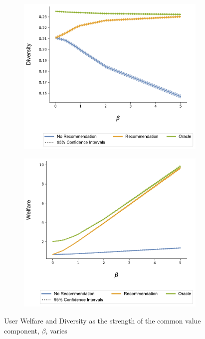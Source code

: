 \documentclass[format=acmsmall, review=false]{acmart}
\begin{document}
\begin{figure}
\begin{subfigure}{.45\linewidth}
  \includegraphics[width=.8\linewidth]{figures/beta_diversity_N_200_T_20.pdf}
\end{subfigure}
\begin{subfigure}{.45\linewidth}
  \includegraphics[width=.8\linewidth]{figures/beta_welfare_N_200_T_20.pdf}
\end{subfigure}
\caption{User Welfare and Diversity as the strength of the common value component, $\beta$, varies}\label{fig:diversity_welfare_common_value}
\end{figure}
\end{document}
